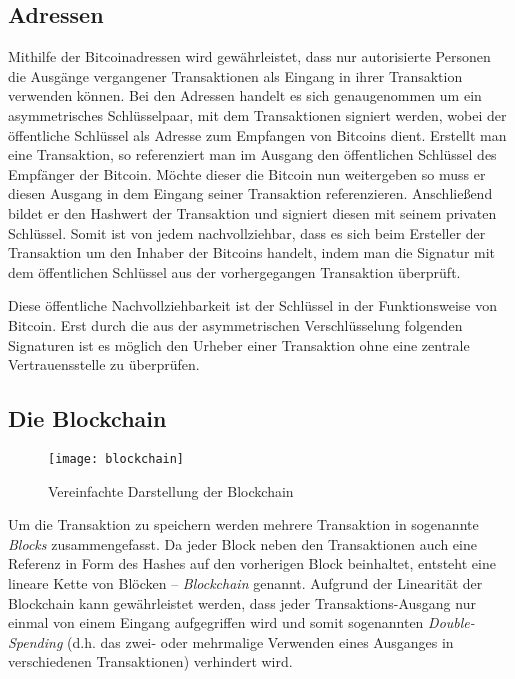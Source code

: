 \subsection{Adressen}

Mithilfe der Bitcoinadressen wird gewährleistet, dass nur autorisierte Personen die Ausgänge vergangener Transaktionen als Eingang in ihrer Transaktion verwenden können.
Bei den Adressen handelt es sich genaugenommen um ein asymmetrisches Schlüsselpaar, mit dem Transaktionen signiert werden, wobei der öffentliche Schlüssel als Adresse zum Empfangen von Bitcoins dient.
Erstellt man eine Transaktion, so referenziert man im Ausgang den öffentlichen Schlüssel des Empfänger der Bitcoin.
Möchte dieser die Bitcoin nun weitergeben so muss er diesen Ausgang in dem Eingang seiner Transaktion referenzieren.
Anschließend bildet er den Hashwert der Transaktion und signiert diesen mit seinem privaten Schlüssel.
Somit ist von jedem nachvollziehbar, dass es sich beim Ersteller der Transaktion um den Inhaber der Bitcoins handelt, indem man die Signatur mit dem öffentlichen Schlüssel aus der vorhergegangen Transaktion überprüft.

Diese öffentliche Nachvollziehbarkeit ist der Schlüssel in der Funktionsweise von Bitcoin.
Erst durch die aus der asymmetrischen Verschlüsselung folgenden Signaturen ist es möglich den Urheber einer Transaktion ohne eine zentrale Vertrauensstelle zu überprüfen.

\subsection{Die Blockchain}

\begin{figure}
    \begin{center}
		\texttt{[image: blockchain]}
    	\caption{Vereinfachte Darstellung der Blockchain \parencite[3]{nakamoto}}
    	\label{fig:blockchain}
    \end{center}
\end{figure}

Um die Transaktion zu speichern werden mehrere Transaktion in sogenannte \emph{Blocks} zusammengefasst.
Da jeder Block neben den Transaktionen auch eine Referenz in Form des Hashes auf den vorherigen Block beinhaltet, entsteht eine lineare Kette von Blöcken -- \emph{Blockchain} genannt.
Aufgrund der Linearität der Blockchain kann gewährleistet werden, dass jeder Transaktions-Ausgang nur einmal von einem Eingang aufgegriffen wird und somit sogenannten \emph{Double-Spending} (d.h. das zwei- oder mehrmalige Verwenden eines Ausganges in verschiedenen Transaktionen) verhindert wird.

